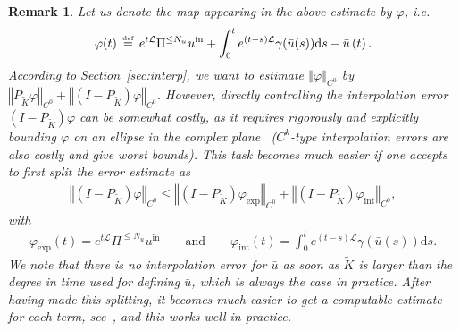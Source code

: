 \documentclass[10pt,a4paper]{article}
\theoremstyle{plain}
\newtheorem{remark}[theorem]{Remark}
\renewcommand{\L}{\mathcal{L}}
\newcommand{\bu}{\bar{u}}
\newcommand{\1}{\mathbf{1}}
\newcommand{\uin}{{u^{\mathrm{in}}}}
\newcommand{\bydef}{\,\stackrel{\mbox{\tiny\textnormal{\raisebox{0ex}[0ex][0ex]{def}}}}{=}\,}
\newcommand{\Nu}{N_{u}}
\newcommand{\Nin}{\Nu}
\begin{document}
\begin{remark}
\label{rem:splitting}
Let us denote the map appearing in the above estimate by $\varphi$, i.e.
\begin{align*}
\varphi(t) \bydef  e^{ t \L} \Pi^{\leq \Nin}\uin +  \int_{0}^{t} e^{(t-s)\L } 
		\gamma(\bu(s)) \mbox{d} s - \bu \left( t \right).
\end{align*}
According to Section~\ref{sec:interp}, we want to estimate $\left\Vert \varphi \right\Vert_{C^0}$ by $\left\Vert P_{\tilde K}\varphi \right\Vert_{C^0} + \left\Vert (I-P_{\tilde K})\varphi \right\Vert_{C^0}$. However, directly controlling the interpolation error $(I-P_{\tilde K})\varphi$ can be somewhat costly,  as it requires rigorously and explicitly bounding $\varphi$ on an ellipse in the complex plane~\cite{Tre13} ($C^k$-type interpolation errors are also costly and give worst bounds). This task becomes much easier if one accepts to first split the error estimate as
\begin{align}
\label{eq:splitinterperror}
\left\Vert (I-P_{\tilde K})\varphi \right\Vert_{C^0} \leq \left\Vert (I-P_{\tilde K})\varphi_{\mathrm{exp}} \right\Vert_{C^0} + \left\Vert (I-P_{\tilde K})\varphi_{\mathrm{int}} \right\Vert_{C^0},
\end{align}
with
\begin{align}
\label{eq:splittingold}
\varphi_{\mathrm{exp}}(t) =   e^{ t \L} \Pi^{\leq \Nin}\uin \qquad\text{and}\qquad \varphi_{\mathrm{int}}(t) = \int_{0}^{t} e^{(t-s)\L } 
		\gamma(\bu(s)) \mbox{d} s.
\end{align}
We note that there is no interpolation error for $\bu$ as soon as $\tilde{K}$ is larger than the degree in time used for defining $\bu$, which is always the case in practice. After having made this splitting, it becomes much easier to get a computable estimate for each term, see~\cite[Lemma 4.5 and Lemma 4.8]{BerBreShe24}, and this works well in practice.


\end{remark}
\end{document}
